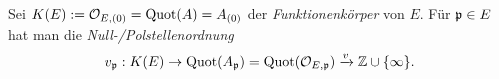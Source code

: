 \begin{bemerkung}
	Sei $K(E) := \mathcal{O}_{E,(0)} = \operatorname{Quot}(A) = A_{(0)}$ der 
	\emph{Funktionenkörper} von $E$.
	Für $\mathfrak{p} \in E$ hat man die \emph{Null-/Polstellenordnung}
	\[
		v_\mathfrak{p}: K(E) \to \operatorname{Quot}(A_\mathfrak{p}) = \operatorname{Quot}(\mathcal{O}_{E,\mathfrak{p}}) \xrightarrow v \mathbb{Z}\cup\{\infty\}.
	\]
\end{bemerkung}
\pagebreak

